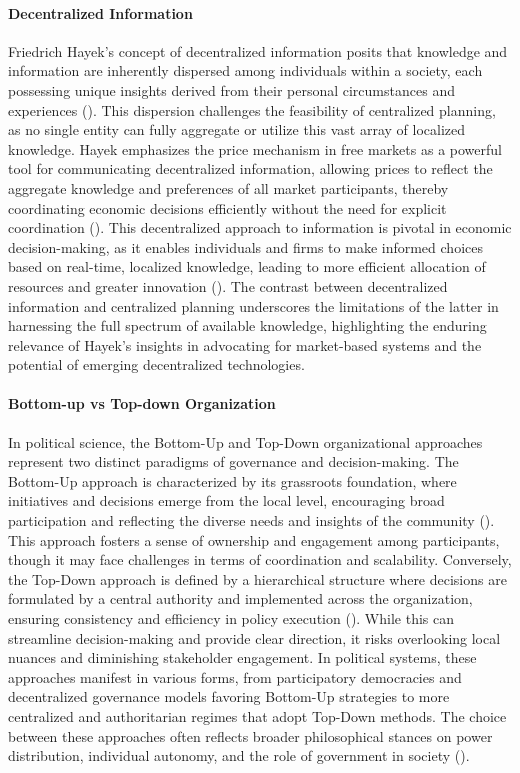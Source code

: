 \documentclass{article}
\begin{document}
\paragraph{Decentralized Information}
Friedrich Hayek's concept of decentralized information posits that knowledge and information are inherently dispersed among individuals within a society, each possessing unique insights derived from their personal circumstances and experiences (\cite{hayek1945}). This dispersion challenges the feasibility of centralized planning, as no single entity can fully aggregate or utilize this vast array of localized knowledge. Hayek emphasizes the price mechanism in free markets as a powerful tool for communicating decentralized information, allowing prices to reflect the aggregate knowledge and preferences of all market participants, thereby coordinating economic decisions efficiently without the need for explicit coordination (\cite{hayek1948}). This decentralized approach to information is pivotal in economic decision-making, as it enables individuals and firms to make informed choices based on real-time, localized knowledge, leading to more efficient allocation of resources and greater innovation (\cite{modernEconomic}). The contrast between decentralized information and centralized planning underscores the limitations of the latter in harnessing the full spectrum of available knowledge, highlighting the enduring relevance of Hayek's insights in advocating for market-based systems and the potential of emerging decentralized technologies.

\paragraph{Bottom-up vs Top-down Organization}
In political science, the Bottom-Up and Top-Down organizational approaches represent two distinct paradigms of governance and decision-making. The Bottom-Up approach is characterized by its grassroots foundation, where initiatives and decisions emerge from the local level, encouraging broad participation and reflecting the diverse needs and insights of the community (\cite{putnam}). This approach fosters a sense of ownership and engagement among participants, though it may face challenges in terms of coordination and scalability. Conversely, the Top-Down approach is defined by a hierarchical structure where decisions are formulated by a central authority and implemented across the organization, ensuring consistency and efficiency in policy execution (\cite{scott}). While this can streamline decision-making and provide clear direction, it risks overlooking local nuances and diminishing stakeholder engagement. In political systems, these approaches manifest in various forms, from participatory democracies and decentralized governance models favoring Bottom-Up strategies to more centralized and authoritarian regimes that adopt Top-Down methods. The choice between these approaches often reflects broader philosophical stances on power distribution, individual autonomy, and the role of government in society (\cite{politicalComparative}).
\end{document}
